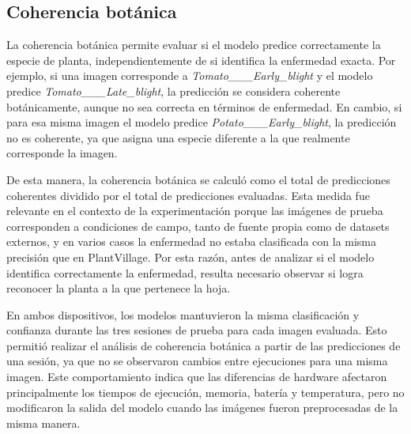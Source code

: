 \subsection{Coherencia botánica}

La coherencia botánica permite evaluar si el modelo predice correctamente la especie de planta, independientemente de si identifica la
enfermedad exacta. Por ejemplo, si una imagen corresponde a \textit{Tomato\_\_\_Early\_blight} y el modelo predice
\textit{Tomato\_\_\_Late\_blight}, la predicción se considera coherente botánicamente, aunque no sea correcta en términos de enfermedad.
En cambio, si para esa misma imagen el modelo predice \textit{Potato\_\_\_Early\_blight}, la predicción no es coherente, ya que asigna
una especie diferente a la que realmente corresponde la imagen.

De esta manera, la coherencia botánica se calculó como el total de predicciones coherentes dividido por el total de predicciones evaluadas.
Esta medida fue relevante en el contexto de la experimentación porque las imágenes de prueba corresponden a condiciones de campo, tanto de
fuente propia como de datasets externos, y en varios casos la enfermedad no estaba clasificada con la misma precisión que en PlantVillage.
Por esta razón, antes de analizar si el modelo identifica correctamente la enfermedad, resulta necesario observar si logra reconocer la
planta a la que pertenece la hoja.

En ambos dispositivos, los modelos mantuvieron la misma clasificación y confianza durante las tres sesiones de prueba para cada imagen
evaluada. Esto permitió realizar el análisis de coherencia botánica a partir de las predicciones de una sesión, ya que no se observaron
cambios entre ejecuciones para una misma imagen. Este comportamiento indica que las diferencias de hardware afectaron principalmente los
tiempos de ejecución, memoria, batería y temperatura, pero no modificaron la salida del modelo cuando las imágenes fueron preprocesadas de
la misma manera.

